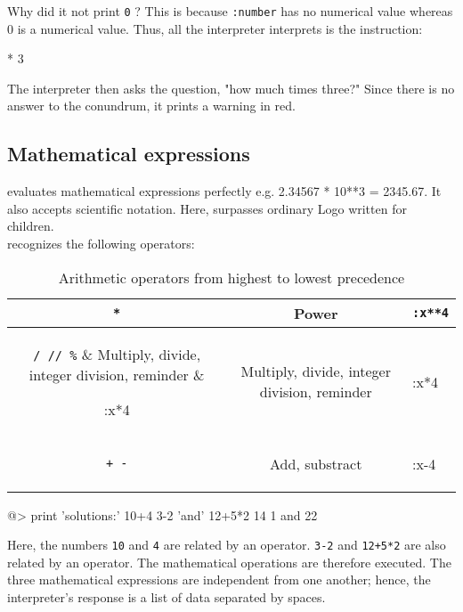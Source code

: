 Why did it not print \verb+0+ ?  This is because {\tt :number} has no numerical value whereas 0 is a numerical value.  Thus, all the interpreter interprets is the instruction:
 
\begin{verbatimtab}
* 3 
\end{verbatimtab}

The interpreter then asks the question, "how much times three?"  Since there is no answer to the conundrum, it prints a warning in red.
 
\subsection{Mathematical expressions} 
 
\squirrel evaluates mathematical expressions perfectly e.g. 2.34567 * 10**3 = 2345.67.  It also accepts scientific notation.  Here, \squirrel surpasses ordinary Logo written for children.\\

\squirrel recognizes the following operators:

\begin{table}[ht!]
\begin{center}
\begin{tabular}{|c|c|l|}
\hline
{\tt **}\index{\verb+**+}& Power & \verb+:x**4+\\
\hline
{\tt * / // \verb+%+} \index{\tt *} \index{\tt /} & Multiply, divide, integer division, reminder & \begin{tt}:x*4\end{tt}\\
\hline
{\tt + -} \index{\tt +} \index{\tt -} & Add, substract & \begin{tt}:x-4\end{tt}\\
\hline
\end{tabular}
\end{center}
\caption{Arithmetic operators from highest to lowest precedence}
\label{arth}
\end{table}
 
\begin{verbatimtab} 
@> print 'solutions:' 10+4 3-2 'and' 12+5*2
14 1 and 22
\end{verbatimtab}
 
Here, the numbers \verb+10+ and \verb+4+ are related by an operator.  {\tt 3-2} and {\tt 12+5*2} are also related by an operator.   
The mathematical operations are therefore executed.  The three mathematical expressions are independent from one another; hence, the interpreter's response is a list of data separated by spaces. 
 
